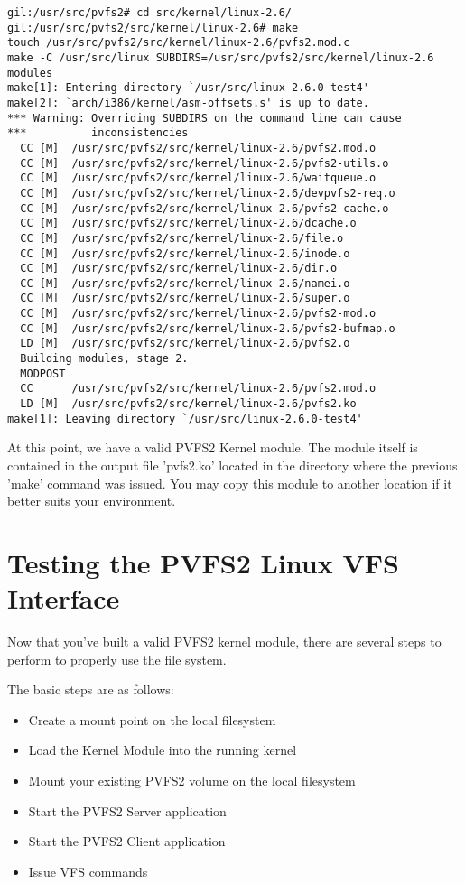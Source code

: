 \documentclass[11pt, letterpaper]{article}
\begin{document}
\begin{verbatim}
gil:/usr/src/pvfs2# cd src/kernel/linux-2.6/
gil:/usr/src/pvfs2/src/kernel/linux-2.6# make
touch /usr/src/pvfs2/src/kernel/linux-2.6/pvfs2.mod.c
make -C /usr/src/linux SUBDIRS=/usr/src/pvfs2/src/kernel/linux-2.6
modules
make[1]: Entering directory `/usr/src/linux-2.6.0-test4'
make[2]: `arch/i386/kernel/asm-offsets.s' is up to date.
*** Warning: Overriding SUBDIRS on the command line can cause
***          inconsistencies
  CC [M]  /usr/src/pvfs2/src/kernel/linux-2.6/pvfs2.mod.o
  CC [M]  /usr/src/pvfs2/src/kernel/linux-2.6/pvfs2-utils.o
  CC [M]  /usr/src/pvfs2/src/kernel/linux-2.6/waitqueue.o
  CC [M]  /usr/src/pvfs2/src/kernel/linux-2.6/devpvfs2-req.o
  CC [M]  /usr/src/pvfs2/src/kernel/linux-2.6/pvfs2-cache.o
  CC [M]  /usr/src/pvfs2/src/kernel/linux-2.6/dcache.o
  CC [M]  /usr/src/pvfs2/src/kernel/linux-2.6/file.o
  CC [M]  /usr/src/pvfs2/src/kernel/linux-2.6/inode.o
  CC [M]  /usr/src/pvfs2/src/kernel/linux-2.6/dir.o
  CC [M]  /usr/src/pvfs2/src/kernel/linux-2.6/namei.o
  CC [M]  /usr/src/pvfs2/src/kernel/linux-2.6/super.o
  CC [M]  /usr/src/pvfs2/src/kernel/linux-2.6/pvfs2-mod.o
  CC [M]  /usr/src/pvfs2/src/kernel/linux-2.6/pvfs2-bufmap.o
  LD [M]  /usr/src/pvfs2/src/kernel/linux-2.6/pvfs2.o
  Building modules, stage 2.
  MODPOST
  CC      /usr/src/pvfs2/src/kernel/linux-2.6/pvfs2.mod.o
  LD [M]  /usr/src/pvfs2/src/kernel/linux-2.6/pvfs2.ko
make[1]: Leaving directory `/usr/src/linux-2.6.0-test4'
\end{verbatim}

At this point, we have a valid PVFS2 Kernel module.  The module itself
is contained in the output file 'pvfs2.ko' located in the directory
where the previous 'make' command was issued.  You may copy this
module to another location if it better suits your environment.

\section{Testing the PVFS2 Linux VFS Interface}
\label{sec:vfs-test}

Now that you've built a valid PVFS2 kernel module, there are several
steps to perform to properly use the file system.

The basic steps are as follows:
\begin{itemize}
\item Create a mount point on the local filesystem
\item Load the Kernel Module into the running kernel
\item Mount your existing PVFS2 volume on the local filesystem
\item Start the PVFS2 Server application
\item Start the PVFS2 Client application
\item Issue VFS commands
\end{itemize}
\end{document}
